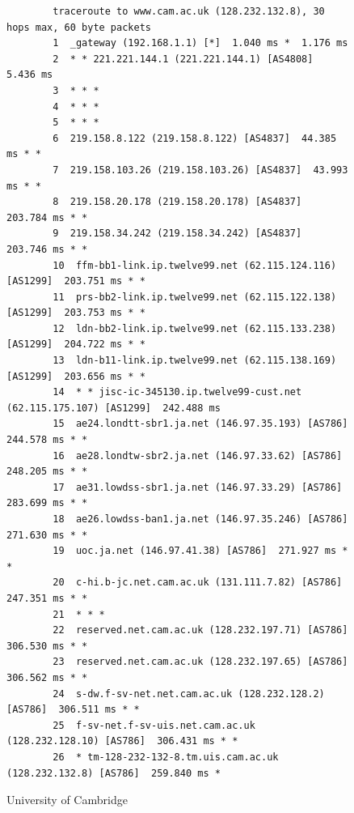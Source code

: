 \documentclass{cshwk}
\begin{document}
\begin{figure}[H]
    \footnotesize
    \begin{verbatim}
        traceroute to www.cam.ac.uk (128.232.132.8), 30 hops max, 60 byte packets
        1  _gateway (192.168.1.1) [*]  1.040 ms *  1.176 ms
        2  * * 221.221.144.1 (221.221.144.1) [AS4808]  5.436 ms
        3  * * *
        4  * * *
        5  * * *
        6  219.158.8.122 (219.158.8.122) [AS4837]  44.385 ms * *
        7  219.158.103.26 (219.158.103.26) [AS4837]  43.993 ms * *
        8  219.158.20.178 (219.158.20.178) [AS4837]  203.784 ms * *
        9  219.158.34.242 (219.158.34.242) [AS4837]  203.746 ms * *
        10  ffm-bb1-link.ip.twelve99.net (62.115.124.116) [AS1299]  203.751 ms * *
        11  prs-bb2-link.ip.twelve99.net (62.115.122.138) [AS1299]  203.753 ms * *
        12  ldn-bb2-link.ip.twelve99.net (62.115.133.238) [AS1299]  204.722 ms * *
        13  ldn-b11-link.ip.twelve99.net (62.115.138.169) [AS1299]  203.656 ms * *
        14  * * jisc-ic-345130.ip.twelve99-cust.net (62.115.175.107) [AS1299]  242.488 ms
        15  ae24.londtt-sbr1.ja.net (146.97.35.193) [AS786]  244.578 ms * *
        16  ae28.londtw-sbr2.ja.net (146.97.33.62) [AS786]  248.205 ms * *
        17  ae31.lowdss-sbr1.ja.net (146.97.33.29) [AS786]  283.699 ms * *
        18  ae26.lowdss-ban1.ja.net (146.97.35.246) [AS786]  271.630 ms * *
        19  uoc.ja.net (146.97.41.38) [AS786]  271.927 ms * *
        20  c-hi.b-jc.net.cam.ac.uk (131.111.7.82) [AS786]  247.351 ms * *
        21  * * *
        22  reserved.net.cam.ac.uk (128.232.197.71) [AS786]  306.530 ms * *
        23  reserved.net.cam.ac.uk (128.232.197.65) [AS786]  306.562 ms * *
        24  s-dw.f-sv-net.net.cam.ac.uk (128.232.128.2) [AS786]  306.511 ms * *
        25  f-sv-net.f-sv-uis.net.cam.ac.uk (128.232.128.10) [AS786]  306.431 ms * *
        26  * tm-128-232-132-8.tm.uis.cam.ac.uk (128.232.132.8) [AS786]  259.840 ms *
    \end{verbatim}
    \caption{University of Cambridge}
    \label{fig:traceroute-cambridge}
\end{figure}
\end{document}
